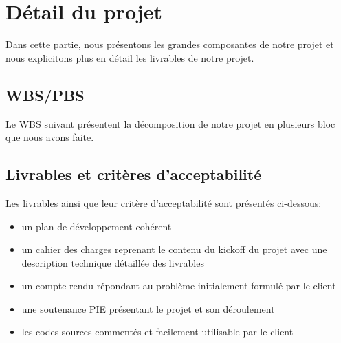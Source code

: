 \chapter*{Détail du projet}
\label{chap:detail}

Dans cette partie, nous présentons les grandes composantes de notre projet et nous explicitons plus en détail les livrables de notre projet.

\section*{WBS/PBS}
Le WBS suivant présentent la décomposition de notre projet en plusieurs bloc que nous avons faite.
 
\section*{Livrables et critères d'acceptabilité}
Les livrables ainsi que leur critère d'acceptabilité sont présentés ci-dessous:
\begin{itemize}
	\item un plan de développement cohérent
	\item un cahier des charges reprenant le contenu du kickoff du projet avec une description technique détaillée des livrables
	\item un compte-rendu répondant au problème initialement formulé par le client
	\item une soutenance PIE présentant le projet et son déroulement
	\item les codes sources commentés et facilement utilisable par le client
\end{itemize}


